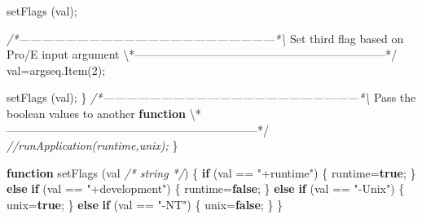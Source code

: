 \documentclass[]{article}
\newenvironment{Shaded}{}{}
\newcommand{\KeywordTok}[1]{\textcolor[rgb]{0.00,0.44,0.13}{\textbf{{#1}}}}
\newcommand{\DecValTok}[1]{\textcolor[rgb]{0.25,0.63,0.44}{{#1}}}
\newcommand{\StringTok}[1]{\textcolor[rgb]{0.25,0.44,0.63}{{#1}}}
\newcommand{\CommentTok}[1]{\textcolor[rgb]{0.38,0.63,0.69}{\textit{{#1}}}}
\newcommand{\OtherTok}[1]{\textcolor[rgb]{0.00,0.44,0.13}{{#1}}}
\newcommand{\FunctionTok}[1]{\textcolor[rgb]{0.02,0.16,0.49}{{#1}}}
\newcommand{\NormalTok}[1]{{#1}}
\begin{document}
\begin{Shaded}
\begin{Highlighting}[]
      \FunctionTok{setFlags} \NormalTok{(val);}
     
\CommentTok{/*------------------------------------------------------------------*\textbackslash{}}
  \NormalTok{Set third flag based on Pro/E input argument}
\NormalTok{\textbackslash{}*------------------------------------------------------------------*}\OtherTok{/}
      \NormalTok{val=}\OtherTok{argseq}\NormalTok{.}\FunctionTok{Item}\NormalTok{(}\DecValTok{2}\NormalTok{);}
      
      \FunctionTok{setFlags} \NormalTok{(val);}
    \NormalTok{\}}
\CommentTok{/*------------------------------------------------------------------*\textbackslash{}}
  \NormalTok{Pass the boolean values to another }\KeywordTok{function}
\NormalTok{\textbackslash{}*------------------------------------------------------------------*}\OtherTok{/}
  \CommentTok{//runApplication(runtime,unix);}
\NormalTok{\}}
    
    
\KeywordTok{function} \FunctionTok{setFlags} \NormalTok{(val }\CommentTok{/* string */}\NormalTok{)}
\NormalTok{\{}
  \KeywordTok{if} \NormalTok{(val == }\StringTok{"+runtime"}\NormalTok{)}
    \NormalTok{\{}
      \NormalTok{runtime=}\KeywordTok{true}\NormalTok{;}
    \NormalTok{\}}
  \KeywordTok{else} \KeywordTok{if} \NormalTok{(val == }\StringTok{"+development"}\NormalTok{)}
    \NormalTok{\{                   }
      \NormalTok{runtime=}\KeywordTok{false}\NormalTok{;}
    \NormalTok{\}      }
  \KeywordTok{else} \KeywordTok{if} \NormalTok{(val == }\StringTok{"-Unix"}\NormalTok{)}
    \NormalTok{\{}
      \NormalTok{unix=}\KeywordTok{true}\NormalTok{;}
    \NormalTok{\}}
  \KeywordTok{else} \KeywordTok{if} \NormalTok{(val == }\StringTok{"-NT"}\NormalTok{)}
    \NormalTok{\{}
      \NormalTok{unix=}\KeywordTok{false}\NormalTok{;}
    \NormalTok{\}}
\NormalTok{\}}
           


\end{Highlighting}
\end{Shaded}
\end{document}
